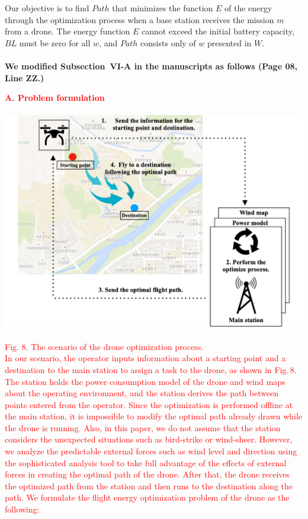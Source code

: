 \documentclass[onecolumn]{IEEEconf}
\begin{document}
\begin{description}
{    Our objective is to find $Path$ that minimizes the function $E$ of the energy through the optimization process when a base station receives the mission $m$ from a drone.
    The energy function $E$ cannot exceed the initial battery capacity, $BL$ must be zero for all $w$, and $Path$ consists only of $w$ presented in $W$.
	}
	~\\
    ~\\
	\textbf{We modified Subsection~VI-A in the manuscripts as follows (Page 08, Line ZZ.)}\\
    \begin{mdframed}[ linewidth=.75pt, userdefinedwidth=0.9\textwidth]
    \textbf{\justify\textcolor{red}{A. Problem formulation}}~\\
    ~\\
    \includegraphics[scale=0.34]{fig8/problem_formulation.pdf}~\\
    \textcolor{red}{Fig. 8. The scenario of the drone optimization process.}~\\
    \justify\textcolor{red}{In our scenario, the operator inputs information about a starting point and a destination to the main station to assign a task to the drone, as shown in Fig.\,8.
    The station holds the power consumption model of the drone and wind maps about the operating environment, and the station derives the path between points entered from the operator.
    Since the optimization is performed offline at the main station, it is impossible to modify the optimal path already drawn while the drone is running. Also, in this paper, we do not assume that the station considers the unexpected situations such as bird-strike or wind-sheer.
    However, we analyze the predictable external forces such as wind level and direction using the sophisticated analysis tool to take full advantage of the effects of external forces in creating the optimal path of the drone. 
    After that, the drone receives the optimized path from the station and then runs to the destination along the path. We formulate the flight energy optimization problem of the drone as the following:}


\end{mdframed}
\end{description}
\end{document}
